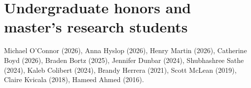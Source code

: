 \documentclass[10.5pt]{article}
\begin{document}
\section{Undergraduate honors and master's research students}
Michael O'Connor (2026), Anna Hyslop (2026), Henry Martin (2026), Catherine Boyd (2026), Braden Bortz (2025), Jennifer Dunbar (2024), Shubhashree Sathe (2024), Kaleb Colibert (2024), Brandy Herrera (2021), Scott McLean (2019), Claire Kvicala (2018), Hameed Ahmed (2016).
\end{document}

